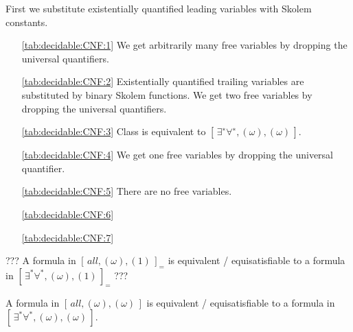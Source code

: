 First we substitute existentially quantified leading variables with Skolem constants.

\begin{itemize}
	\item[\ref{tab:decidable:CNF:1}] We get arbitrarily many free variables by dropping the universal quantifiers.
	\item[\ref{tab:decidable:CNF:2}]
	Existentially quantified trailing variables are substituted by binary Skolem functions.
	We get two free variables by dropping the universal quantifiers.
	\item[\ref{tab:decidable:CNF:3}]
	Class is equivalent to $[\,\exists^{∗}\forall^{∗}, (\omega), (\omega)\,]$.
	\item[\ref{tab:decidable:CNF:4}]
	We get one free variables by dropping the universal quantifier.
	\item[\ref{tab:decidable:CNF:5}]
	There are no free variables.
	\item[\ref{tab:decidable:CNF:6}]
	\item[\ref{tab:decidable:CNF:7}]
\end{itemize}

\begin{lemma}\label{lem:unary:equals}
??? A formula in $[\,all, (\omega), (1)\,]_=$ is equivalent / equisatisfiable 
to a formula in $[\,\exists^*\forall^*, (\omega), (1)\,]_=$ ???
\end{lemma}

\begin{lemma}\label{lem:unary}
	A formula in $[\,all, (\omega), (\omega)\,]$ is equivalent / equisatisfiable 
	to a formula in $[\,\exists^*\forall^*, (\omega), (\omega)\,]$.
\end{lemma}


